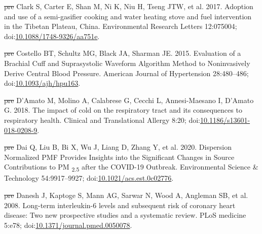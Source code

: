 \documentclass[
  letterpaper,
  DIV=11,
  numbers=noendperiod]{scrartcl}
\newlength{\cslhangindent}
\newenvironment{CSLReferences}[2] %
 {\begin{list}{}{%
  \setlength{\itemindent}{0pt} %
  \setlength{\leftmargin}{0pt} %
  \setlength{\parsep}{0pt} %
  \ifodd #1
   \setlength{\leftmargin}{\cslhangindent} %
   \setlength{\itemindent}{-1\cslhangindent} %
  \fi
  \setlength{\itemsep}{#2\baselineskip}}} %
 {\end{list}} %
\providecommand{\DIFdeltex}[1]{{\protect\color{red}\sout{#1}}}                      %
\providecommand{\DIFaddbegin}{} %
\providecommand{\DIFaddend}{} %
\providecommand{\DIFdelbegin}{} %
\providecommand{\DIFdelend}{} %
\providecommand{\DIFdel}[1]{\texorpdfstring{\DIFdeltex{#1}}{}} %
\newcommand{\DIFscaledelfig}{0.5}
\newlength{\DIFdelgraphicswidth} %
\newlength{\DIFdelgraphicsheight} %
\newcommand{\DIFaddincludegraphics}[2][]{{\color{blue}\fbox{\DIFOincludegraphics[#1]{#2}}}} %
\newcommand{\DIFdelincludegraphics}[2][]{%
\sbox{\DIFdelgraphicsbox}{\DIFOincludegraphics[#1]{#2}}%
\settoboxwidth{\DIFdelgraphicswidth}{\DIFdelgraphicsbox} %
\settoboxtotalheight{\DIFdelgraphicsheight}{\DIFdelgraphicsbox} %
\scalebox{\DIFscaledelfig}{%
\parbox[b]{\DIFdelgraphicswidth}{\usebox{\DIFdelgraphicsbox}\\[-\baselineskip] \rule{\DIFdelgraphicswidth}{0em}}\llap{\resizebox{\DIFdelgraphicswidth}{\DIFdelgraphicsheight}{%
\setlength{\unitlength}{\DIFdelgraphicswidth}%
\begin{picture}(1,1)%
\thicklines\linethickness{2pt} %
{\color[rgb]{1,0,0}\put(0,0){\framebox(1,1){}}}%
{\color[rgb]{1,0,0}\put(0,0){\line( 1,1){1}}}%
{\color[rgb]{1,0,0}\put(0,1){\line(1,-1){1}}}%
\end{picture}%
}\hspace*{3pt}}} %
} %
\DeclareRobustCommand{\DIFaddbegin}{\DIFOaddbegin \let\includegraphics\DIFaddincludegraphics} %
\DeclareRobustCommand{\DIFaddend}{\DIFOaddend \let\includegraphics\DIFOincludegraphics} %
\DeclareRobustCommand{\DIFdelbegin}{\DIFOdelbegin \let\includegraphics\DIFdelincludegraphics} %
\DeclareRobustCommand{\DIFdelend}{\DIFOaddend \let\includegraphics\DIFOincludegraphics} %
\begin{document}
\begin{CSLReferences}{1}{1}
\DIFdelbegin %
\DIFdel{pre}%
\DIFdelend \DIFaddbegin {}
\DIFaddend Clark S, Carter E, Shan M, Ni K, Niu H, Tseng JTW, et al. 2017. Adoption
and use of a semi-gasifier cooking and water heating stove and fuel
intervention in the {Tibetan Plateau}, {China}. Environmental Research
Letters 12:075004;
doi:\href{https://doi.org/10.1088/1748-9326/aa751e}{10.1088/1748-9326/aa751e}.

\DIFdelbegin %
\DIFdel{pre}%
\DIFdelend \DIFaddbegin {}
\DIFaddend Costello BT, Schultz MG, Black JA, Sharman JE. 2015. Evaluation of a
{Brachial Cuff} and {Suprasystolic Waveform Algorithm Method} to
{Noninvasively Derive Central Blood Pressure}. American Journal of
Hypertension 28:480--486;
doi:\href{https://doi.org/10.1093/ajh/hpu163}{10.1093/ajh/hpu163}.

\DIFdelbegin %
\DIFdel{pre}%
\DIFdelend \DIFaddbegin {}
\DIFaddend D'Amato M, Molino A, Calabrese G, Cecchi L, Annesi-Maesano I, D'Amato G.
2018. The impact of cold on the respiratory tract and its consequences
to respiratory health. Clinical and Translational Allergy 8:20;
doi:\href{https://doi.org/10.1186/s13601-018-0208-9}{10.1186/s13601-018-0208-9}.

\DIFdelbegin %
\DIFdel{pre}%
\DIFdelend \DIFaddbegin {}
\DIFaddend Dai Q, Liu B, Bi X, Wu J, Liang D, Zhang Y, et al. 2020. Dispersion
{Normalized PMF Provides Insights} into the {Significant Changes} in
{Source Contributions} to {PM} {\textsubscript{2.5}} after the {COVID-19
Outbreak}. Environmental Science \& Technology 54:9917--9927;
doi:\href{https://doi.org/10.1021/acs.est.0c02776}{10.1021/acs.est.0c02776}.

\DIFdelbegin %
\DIFdel{pre}%
\DIFdelend \DIFaddbegin {}
\DIFaddend Danesh J, Kaptoge S, Mann AG, Sarwar N, Wood A, Angleman SB, et al.
2008. Long-term interleukin-6 levels and subsequent risk of coronary
heart disease: Two new prospective studies and a systematic review. PLoS
medicine 5:e78;
doi:\href{https://doi.org/10.1371/journal.pmed.0050078}{10.1371/journal.pmed.0050078}.


\end{CSLReferences}
\end{document}
